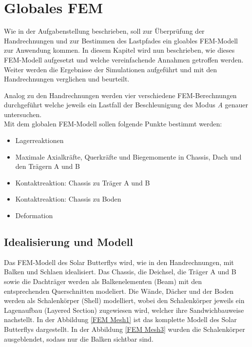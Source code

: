 \section{Globales FEM}
Wie in der Aufgabenstellung beschrieben, soll zur Überprüfung der Handrechnungen und zur Bestimmen des Lastpfades ein gloables FEM-Modell zur Anwendung kommen. In diesem Kapitel wird nun beschrieben, wie dieses FEM-Modell aufgesetzt und welche vereinfachende Annahmen getroffen werden. Weiter werden die Ergebnisse der Simulationen aufgeführt und mit den Handrechnungen verglichen und beurteilt.


Analog zu den Handrechnungen werden vier verschiedene FEM-Berechnungen durchgeführt welche jeweils ein Lastfall der Beschleunigung des Modus \emph{A} genauer untersuchen.\\

Mit dem globalen FEM-Modell sollen folgende Punkte bestimmt werden:
\begin{itemize}
  \item Lagerreaktionen
  \item Maximale Axialkräfte, Querkräfte und Biegemomente in Chassis, Dach und den Trägern A und B
  \item Kontaktreaktion: Chassis zu Träger A und B
  \item Kontaktreaktion: Chassis zu Boden
  \item Deformation
\end{itemize}

\subsection{Idealisierung und Modell}
Das FEM-Modell des Solar Butterflys wird, wie in den Handrechnungen, mit Balken und Schlaen idealisiert. Das Chassis, die Deichsel, die Träger A und B sowie die Dachträger werden als Balkenelementen (Beam) mit den entsprechenden Querschnitten modeliert. Die Wände, Dächer und der Boden werden als Schalenkörper (Shell) modelliert, wobei den Schalenkörper jeweils ein Lagenaufbau (Layered Section) zugewiesen wird, welcher ihre Sandwichbauweise nachstellt. In der Abbildung \ref{FEM Mesh1} ist das komplette Modell des Solar Butterflys dargestellt. In der Abbildung \ref{FEM Mesh3} wurden die Schalenkörper ausgeblendet, sodass nur die Balken sichtbar sind.

